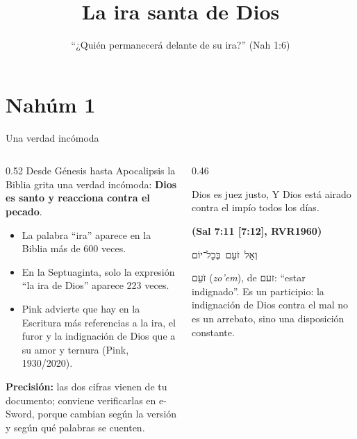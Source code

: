 \documentclass[hyperref={bookmarks=false},aspectratio=169]{beamer}
\title[La ira santa]{\bfseries{La ira santa de Dios}}
\subtitle{``¿Quién permanecerá delante de su ira?'' (Nah 1:6)}
\author{}\institute{}\date{}
\newcommand{\heb}[1]{\mbox{\foreignlanguage{hebrew}{#1}}}
\newcommand{\fuente}[1]{\par\hfill{\upshape\bfseries\footnotesize\textcolor{azul}{#1}}}
\newcommand{\destacar}[1]{\textbf{\textcolor{azul}{#1}}}
\newcommand{\precision}[1]{{\footnotesize\color{gris}\textbf{Precisión:} #1}}
\begin{document}
\frame{\titlepage}


\section{Nahúm 1}

\begin{frame}{Una verdad incómoda}
\begin{columns}[c,onlytextwidth]
\begin{column}{0.52\textwidth}\small
Desde Génesis hasta Apocalipsis la Biblia grita una verdad incómoda: \destacar{Dios es santo y reacciona contra el pecado}.
\begin{itemize}
\item La palabra ``ira'' aparece en la Biblia más de 600 veces.
\item En la Septuaginta, solo la expresión ``la ira de Dios'' aparece 223 veces.
\item Pink advierte que hay en la Escritura más referencias a la ira, el furor y la indignación de Dios que a su amor y ternura (Pink, 1930/2020).
\end{itemize}
\precision{las dos cifras vienen de tu documento; conviene verificarlas en e-Sword, porque cambian según la versión y según qué palabras se cuenten.}
\end{column}
\begin{column}{0.46\textwidth}
\begin{cita}Dios es juez justo, Y Dios está airado contra el impío todos los días.\fuente{(Sal 7:11 [7:12], RVR1960)}\end{cita}
\begin{center}\heb{וְאֵל זֹעֵם בְּכָל־יוֹם}\end{center}
\scriptsize\heb{זֹעֵם} (\emph{zo'em}), de \heb{זעם}: ``estar indignado''. Es un participio: la indignación de Dios contra el mal no es un arrebato, sino una disposición constante.
\end{column}
\end{columns}
\end{frame}
\end{document}
